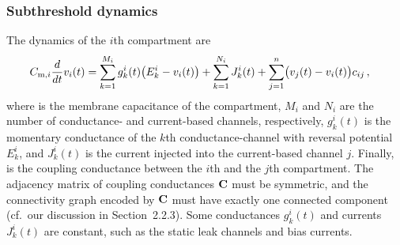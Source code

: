 \subsubsection{Subthreshold dynamics}
The dynamics of the $i$th compartment are
\begin{align}
	{\ensuremath{C_{\mathrm{m}, i}}} \frac{d}{dt} {v_i}(t) &=
		\sum_{k=1}^{M_i} g_k^i(t) \bigl( E_k^i - {v_i}(t) \bigr) +
		\sum_{k=1}^{N_i} J_k^i(t) +
		\sum_{j=1}^{n} \bigl({v_j}(t) - {v_i}(t)\bigr) c_{ij} \,,
\label{eqn:nlif_single_compartment}
\end{align}
where \Cmi is the membrane capacitance of the compartment, $M_i$ and $N_i$ are the number of conductance- and current-based channels, respectively, $g_{k}^i(t)$ is the momentary conductance of the $k$th conductance-channel with reversal potential $E_{k}^i$, and $J_{k}^i(t)$ is the current injected into the current-based channel $j$.
Finally, \cij is the coupling conductance between the $i$th and the $j$th compartment.
The adjacency matrix of coupling conductances $\mathbf{C}$ must be symmetric, and the connectivity graph encoded by $\mathbf{C}$ must have exactly one connected component (cf.~our discussion in Section~2.2.3).
Some conductances $g_{k}^i(t)$ and currents $J_{k}^i(t)$ are constant, such as the static leak channels and bias currents.

